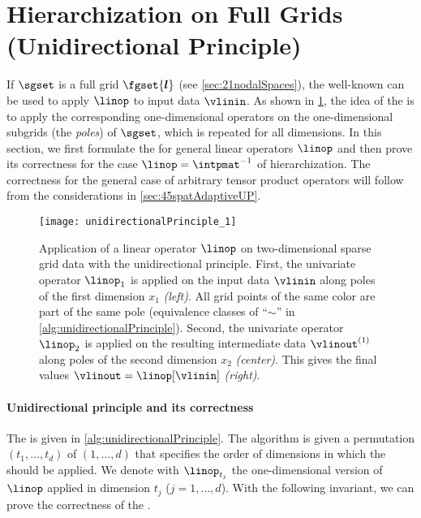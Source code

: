 \section{Hierarchization on Full Grids (Unidirectional Principle)}
\label{sec:42fullGrids}

If $\sgset$ is a full grid $\fgset{\*l}$
(see \cref{sec:21nodalSpaces}),
the well-known \emph{\up}
can be used to apply $\linop$ to input data $\vlinin$.
As shown in \cref{fig:unidirectionalPrinciple}, the idea of the \up
is to apply the corresponding one-dimensional operators on the
one-dimensional subgrids (the \emph{poles}) of $\sgset$,
which is repeated for all dimensions.
In this section, we first formulate the \up for
general linear operators $\linop$ and then prove its correctness for
the case $\linop = \intpmat^{-1}$ of hierarchization.
The correctness for the general case of arbitrary tensor product operators
will follow from the considerations in \cref{sec:45spatAdaptiveUP}.

\begin{figure}
  \texttt{[image: unidirectionalPrinciple\_1]}%
  \caption[%
    Unidirectional principle%
  ]{%
    Application of a linear operator $\linop$
    on two-dimensional sparse grid data with the unidirectional principle.
    First, the univariate operator $\linop_1$ is applied on
    the input data $\vlinin$
    along poles of the first dimension $x_1$ \emph{(left)}.
    All grid points of the same color are part of the same pole
    (equivalence classes of ``$\sim$'' in \cref{alg:unidirectionalPrinciple}).
    Second, the univariate operator $\linop_2$ is applied on the
    resulting intermediate data $\vlinout^{(1)}$
    along poles of the second dimension $x_2$ \emph{(center)}.
    This gives the final values $\vlinout = \linop[\vlinin]$ \emph{(right)}.%
  }%
  \label{fig:unidirectionalPrinciple}%
\end{figure}

\paragraph{Unidirectional principle and its correctness}

The \up is given in \cref{alg:unidirectionalPrinciple}.
The algorithm is given a permutation $(t_1, \dotsc, t_d)$ of $(1, \dotsc, d)$
that specifies the order of dimensions in which the \up should be applied.
We denote with $\linop_{t_j}$ the one-dimensional version of $\linop$
applied in dimension $t_j$ ($j = 1, \dotsc, d$).
With the following invariant, we can prove the correctness of the \up.

